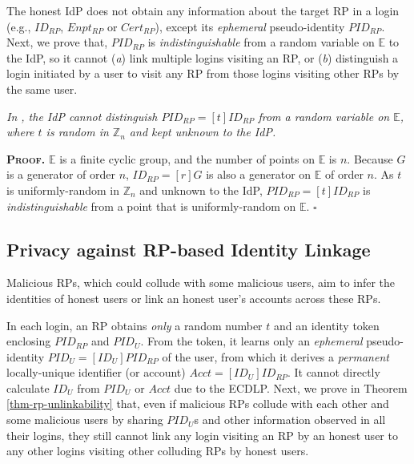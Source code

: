 The honest IdP does not obtain any information about the target RP in a login (e.g., $ID_{RP}$, $Enpt_{RP}$ or $Cert_{RP}$), except its \emph{ephemeral} pseudo-identity $PID_{RP}$.
Next, we prove that, $PID_{RP}$ is \emph{indistinguishable} from a random variable on $\mathbb{E}$ to the IdP,
    so 
 it cannot (\emph{a}) link multiple logins visiting an RP, or (\emph{b}) distinguish a login initiated by a user to visit any RP from those logins visiting other RPs by the same user. %


\vspace{-0.5mm}
\begin{thm}
\emph{In \usso, the IdP cannot distinguish $PID_{RP} = [t]ID_{RP}$ from a random variable on $\mathbb{E}$, where $t$ is random in $\mathbb{Z}_n$ and kept unknown to the IdP.}\label{thm-idp-untraceability}
\end{thm}
\vspace{-0.5mm}

\noindent\textbf{\textsc{Proof.}}
$\mathbb{E}$ is a finite cyclic group, and the number of points on $\mathbb{E}$ is $n$.
Because $G$ is a generator of order $n$, $ID_{RP} = [r]G$ is also a generator on $\mathbb{E}$ of order $n$.
As $t$ is uniformly-random in $\mathbb{Z}_n$ and unknown to the IdP, $PID_{RP} = [t]ID_{RP}$ is \emph{indistinguishable} from a point that is uniformly-random on $\mathbb{E}$. \hfill $\square$
\vspace{1.5mm}


\subsection{Privacy against RP-based Identity Linkage}
\label{subsec:RP-privacy}

Malicious RPs,
which could collude with some malicious users,
aim to infer the identities of honest users
    or link an honest user's accounts across these RPs.


In each login, an RP obtains \emph{only} a random number $t$ and an identity token enclosing $PID_{RP}$ and $PID_U$. From the token, it learns only an \emph{ephemeral} pseudo-identity $PID_{U} = [{ID_U}]{PID_{RP}}$ of the user, from which it derives a \emph{permanent} locally-unique identifier (or account) $Acct = [ID_U]ID_{RP}$.
It cannot directly calculate $ID_U$ from $PID_{U}$ or $Acct$ due to the ECDLP.
Next, we prove in Theorem \ref{thm-rp-unlinkability} that, even if malicious RPs collude with each other and some malicious users by sharing $PID_U$s and other information observed in all their logins,
they still cannot link any login visiting an RP by an honest user to any other logins visiting other colluding RPs by honest users.


